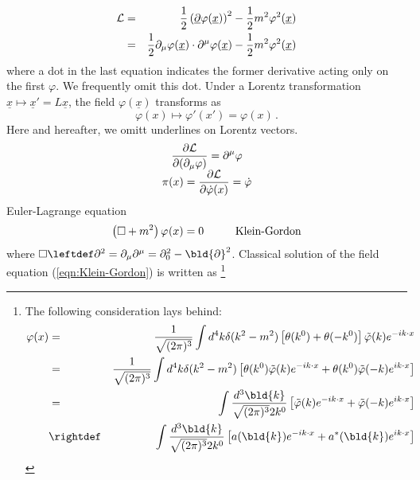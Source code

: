 \begin{eqnarray}
{\cal L} &=& \frac{1}{2} 
\left( \underline{\partial} \varphi(\underline{x}) \right)^2
-\frac{1}{2} m^2 \varphi^2(\underline{x})
\nonumber\\
&=& \frac{1}{2} 
\partial_\mu \varphi(\underline{x})\cdot \partial^\mu \varphi(\underline{x})
-\frac{1}{2} m^2 \varphi^2(\underline{x})
\label{eqn:RSCLagrangiandensity}
\end{eqnarray}
where a dot in the last equation indicates the former derivative acting only on the first $\varphi$.
We frequently omit this dot.
Under a Lorentz transformation $\underline{x} \mapsto \underline{x}' = L\underline{x}$,
the field $\varphi(\underline{x})$ transforms as
\begin{equation}
\varphi(x) \mapsto \varphi'(x') = \varphi(x)\,.
\end{equation}
Here and hereafter, we omitt underlines on Lorentz vectors.
\begin{equation}
\begin{array}{c}
\displaystyle
\frac{\partial {\cal L}}{\partial(\partial_\mu \varphi)} = \partial^\mu \varphi
\\
\displaystyle
\pi(x) = \frac{ \partial {\cal L}}{ \partial \dot{\varphi}(x) } = \dot{\varphi}
\end{array}
\end{equation}
Euler-Lagrange equation
\begin{equation}
\left( \Box + m^2 \right) \varphi_{}(x) = 0
\hspace{10mm}
\mbox{Klein-Gordon}
\label{eqn:Klein-Gordon}
\end{equation}
where $\Box \leftdef \partial^2 = \partial_\mu \partial^\mu = \partial_0^2 - \bld{\partial}^2$.
Classical solution of the field equation (\ref{eqn:Klein-Gordon}) is written as
\footnote{%
The following consideration lays behind:
\begin{eqnarray*}
\varphi(x)
&=&
\frac{1}{\sqrt{(2\pi)^3}}
\int 
d^4 k
\delta(k^2 - m^2)
\left[
\theta(k^0) + \theta(-k^0)
\right]
\tilde{\varphi} (k)
e^{-i k \cdot x}
\nonumber\\
&=&
\frac{1}{\sqrt{(2\pi)^3}}
\int 
d^4 k
\delta(k^2 - m^2)
\left[
\theta(k^0)
\tilde{\varphi} (k)
e^{-i k \cdot x}
 + \theta(k^0)
\tilde{\varphi} (-k)
e^{i k \cdot x}
\right]
\nonumber\\
&=&
\int 
\frac{d^3 \bld{k}}{\sqrt{(2\pi)^3}2 k^0}
\left[
\tilde{\varphi} (k)
e^{-i k \cdot x}
 + 
\tilde{\varphi} (-k)
e^{i k \cdot x}
\right]
\nonumber\\
&\rightdef&
\int 
\frac{d^3 \bld{k}}{\sqrt{(2\pi)^3}2 k^0}
\left[
a (\bld{k})
e^{-i k \cdot x}
 +
 a^*(\bld{k}) 
e^{i k \cdot x}
\right]
\end{eqnarray*}
}%
